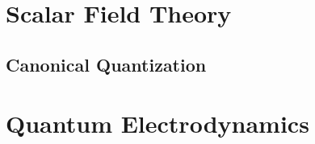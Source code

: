 \documentclass[12pt]{article}
\numberwithin{equation}{subsection}
\theoremstyle{mystyle}{\newtheorem{definition}{Definition}[subsection]}
\theoremstyle{mystyle}{\newtheorem{theorem}[definition]{Theorem}}
\theoremstyle{mystyle}{\newtheorem*{remark}{Remark}}
\theoremstyle{mystyle}{\newtheorem{example}{Example}[subsection]}
\theoremstyle{mystyle}{\newtheorem{examples}{Examples}[subsection]}
\theoremstyle{mystyle}{\newtheorem{cthm}{}[subsection]}
\begin{document}
\newpage

\section{Scalar Field Theory}

\subsection{Canonical Quantization}

\section{Quantum Electrodynamics}


\newpage
\appendix
{}
\end{document}
